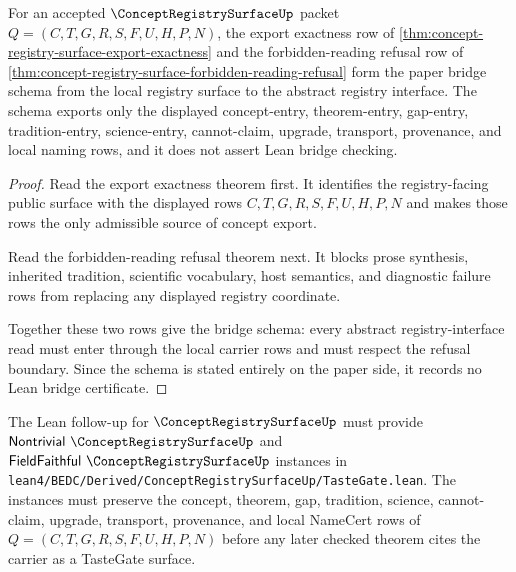 \begin{theorem}
\label{thm:concept-registry-surface-bridge-schema}
For an accepted $\ConceptRegistrySurfaceUp$ packet $Q=(C,T,G,R,S,F,U,H,P,N)$, the export exactness row of \autoref{thm:concept-registry-surface-export-exactness} and the forbidden-reading refusal row of \autoref{thm:concept-registry-surface-forbidden-reading-refusal} form the paper bridge schema from the local registry surface to the abstract registry interface. The schema exports only the displayed concept-entry, theorem-entry, gap-entry, tradition-entry, science-entry, cannot-claim, upgrade, transport, provenance, and local naming rows, and it does not assert Lean bridge checking.
\end{theorem}
\begin{proof}
Read the export exactness theorem first. It identifies the registry-facing public surface with the displayed rows $C,T,G,R,S,F,U,H,P,N$ and makes those rows the only admissible source of concept export.

Read the forbidden-reading refusal theorem next. It blocks prose synthesis, inherited tradition, scientific vocabulary, host semantics, and diagnostic failure rows from replacing any displayed registry coordinate.

Together these two rows give the bridge schema: every abstract registry-interface read must enter through the local carrier rows and must respect the refusal boundary. Since the schema is stated entirely on the paper side, it records no Lean bridge certificate.
\end{proof}



The Lean follow-up for $\ConceptRegistrySurfaceUp$ must provide $\mathsf{Nontrivial}\ \ConceptRegistrySurfaceUp$ and $\mathsf{FieldFaithful}\ \ConceptRegistrySurfaceUp$ instances in \texttt{lean4/BEDC/Derived/ConceptRegistrySurfaceUp/TasteGate.lean}. The instances must preserve the concept, theorem, gap, tradition, science, cannot-claim, upgrade, transport, provenance, and local NameCert rows of $Q=(C,T,G,R,S,F,U,H,P,N)$ before any later checked theorem cites the carrier as a TasteGate surface.

